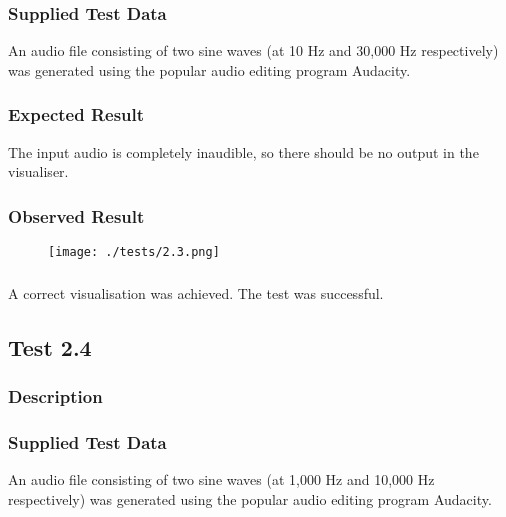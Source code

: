 \subsubsection{Supplied Test Data}
An audio file consisting of two sine waves (at 10 Hz and 30,000 Hz respectively) was generated using the popular audio editing program Audacity.

\subsubsection{Expected Result}
The input audio is completely inaudible, so there should be no output in the visualiser.

\subsubsection{Observed Result}
\begin{figure}[H]
	\texttt{[image: ./tests/2.3.png]}
\end{figure}

\subsubsection{}
A correct visualisation was achieved. The test was successful.

\pagebreak
\subsection{Test 2.4}
\subsubsection{Description}
\paragraph{}
{
	\centering
}

\subsubsection{Supplied Test Data}
An audio file consisting of two sine waves (at 1,000 Hz and 10,000 Hz respectively) was generated using the popular audio editing program Audacity.

